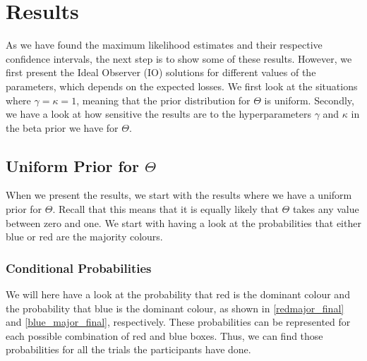 \chapter{Results}

As we have found the maximum likelihood estimates and their respective confidence intervals, the next step is to show some of these results. However, we first present the Ideal Observer (IO) solutions for different values of the parameters, which depends on the expected losses. We first look at the situations where $\gamma=\kappa=1$, meaning that the prior distribution for $\Theta$ is uniform. Secondly, we have a look at how sensitive the results are to the hyperparameters $\gamma$ and $\kappa$ in the beta prior we have for $\Theta$.

\section{Uniform Prior for $\Theta$}
When we present the results, we start with the results where we have a uniform prior for $\Theta$. Recall that this means that it is equally likely that $\Theta$ takes any value between zero and one. We start with having a look at the probabilities that either blue or red are the majority colours. 

\subsection{Conditional Probabilities}
We will here have a look at the probability that red is the dominant colour and the probability that blue is the dominant colour, as shown in \eqref{redmajor_final} and \eqref{blue_major_final}, respectively. These probabilities can be represented for each possible combination of red and blue boxes. Thus, we can find those probabilities for all the trials the participants have done. 

